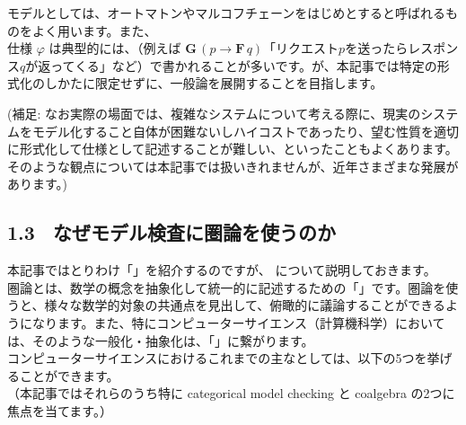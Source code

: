 \documentclass[
		head_space=20mm,
		foot_space=20mm,
		gutter=10mm,
		line_length=190mm
]{jlreq}
\begin{document}
\noindent モデルとしては、オートマトンやマルコフチェーンをはじめとすると呼ばれるものをよく用います。また、\\
\noindent 仕様 $\varphi$ は典型的には、（例えば $\mathbf{G}\,(p\to\mathbf{F}\,q)$「リクエスト$p$を送ったらレスポンス$q$が返ってくる」など）で書かれることが多いです。が、本記事では特定の形式化のしかたに限定せずに、一般論を展開することを目指します。\vspace{15pt}

\noindent (補足: なお実際の場面では、複雑なシステムについて考える際に、現実のシステムをモデル化すること自体が困難ないしハイコストであったり、望む性質を適切に形式化して仕様として記述することが難しい、といったこともよくあります。そのような観点については本記事では扱いきれませんが、近年さまざまな発展があります。)

\clearpage

\subsection*{1.3~ なぜモデル検査に圏論を使うのか}

\noindent 本記事ではとりわけ「」を紹介するのですが、
について説明しておきます。
\vspace{5pt}\\
\noindent 圏論とは、数学の概念を抽象化して統一的に記述するための「」です。圏論を使うと、様々な数学的対象の共通点を見出して、俯瞰的に議論することができるようになります。また、特にコンピューターサイエンス（計算機科学）においては、そのような一般化・抽象化は、「」に繋がります。
\vspace{5pt}\\
コンピューターサイエンスにおけるこれまでの主なとしては、以下の5つを挙げることができます。\\（本記事ではそれらのうち特に categorical model checking と coalgebra の2つに焦点を当てます。）
\end{document}

